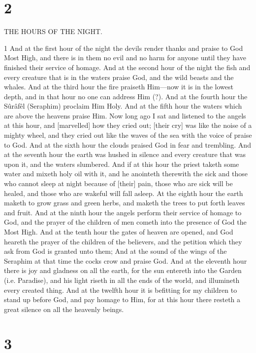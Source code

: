 \chapter{2}

\par THE HOURS OF THE NIGHT.

\par 1 And at the first hour of the night the devils render thanks and praise to God Most High, and there is in them no evil and no harm for anyone until they have finished their service of homage. And at the second hour of the night the fish and every creature that is in the waters praise God, and the wild beasts and the whales. And at the third hour the fire praiseth Him—now it is in the lowest depth, and in that hour no one can address Him (?). And at the fourth hour the Sûrâfêl (Seraphim) proclaim Him Holy. And at the fifth hour the waters which are above the heavens praise Him. Now long ago I sat and listened to the angels at this hour, and [marvelled] how they cried out; [their cry] was like the noise of a mighty wheel, and they cried out like the waves of the sea with the voice of praise to God. And at the sixth hour the clouds praised God in fear and trembling. And at the seventh hour the earth was hushed in silence and every creature that was upon it, and the waters slumbered. And if at this hour the priest taketh some water and mixeth holy oil with it, and he anointeth therewith the sick and those who cannot sleep at night because of [their] pain, those who are sick will be healed, and those who are wakeful will fall asleep. At the eighth hour the earth maketh to grow grass and green herbs, and maketh the trees to put forth leaves and fruit. And at the ninth hour the angels perform their service of homage to God, and the prayer of the children of men cometh into the presence of God the Most High. And at the tenth hour the gates of heaven are opened, and God heareth the prayer of the children of the believers, and the petition which they ask from God is granted unto them; And at the sound of the wings of the Seraphim at that time the cocks crow and praise God. And at the eleventh hour there is joy and gladness on all the earth, for the sun entereth into the Garden (i.e. Paradise), and his light riseth in all the ends of the world, and illumineth every created thing. And at the twelfth hour it is befitting for my children to stand up before God, and pay homage to Him, for at this hour there resteth a great silence on all the heavenly beings.

\chapter{3}

